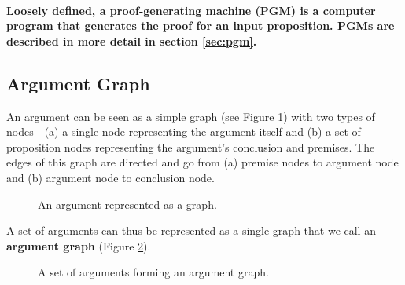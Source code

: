 \documentclass[a4paper]{article}
\begin{document}
\paragraph{Loosely defined, a \textbf{proof-generating machine} (PGM) is a computer program that generates the proof for an input proposition. PGMs are described in more detail in section \ref{sec:pgm}.}

\subsection{Argument Graph}
An argument can be seen as a simple graph (see Figure \ref{argument}) with two types of nodes - (a) a single node representing the argument itself and (b) a set of proposition nodes representing the argument's conclusion and premises. The edges of this graph are directed and go from (a) premise nodes to argument node and (b) argument node to conclusion node.

\begin{figure}[htbp]
\begin{center}
\caption{An argument represented as a graph.}
\label{argument}
\end{center}
\end{figure}

A set of arguments can thus be represented as a single graph that we call an \textbf{argument graph} (Figure \ref{argument_graph}).

\begin{figure}[htbp]
\begin{center}
\caption{A set of arguments forming an argument graph.}
\label{argument_graph}
\end{center}
\end{figure}
\end{document}
